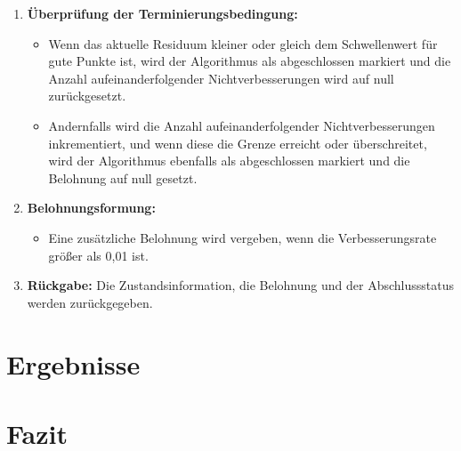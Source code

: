 \documentclass{article}
\theoremstyle{newline}
\begin{document}
\begin{onehalfspace}
\begin{enumerate}
	\item \textbf{Überprüfung der Terminierungsbedingung:}
	\begin{itemize}
		\item Wenn das aktuelle Residuum kleiner oder gleich dem Schwellenwert für gute Punkte ist, wird der Algorithmus als abgeschlossen markiert und die Anzahl aufeinanderfolgender Nichtverbesserungen wird auf null zurückgesetzt.
		\item Andernfalls wird die Anzahl aufeinanderfolgender Nichtverbesserungen inkrementiert, und wenn diese die Grenze erreicht oder überschreitet, wird der Algorithmus ebenfalls als abgeschlossen markiert und die Belohnung auf null gesetzt.
	\end{itemize}
	
	\item \textbf{Belohnungsformung:}
	\begin{itemize}
		\item Eine zusätzliche Belohnung wird vergeben, wenn die Verbesserungsrate größer als 0,01 ist.
	\end{itemize}
	
	\item \textbf{Rückgabe:}
	Die Zustandsinformation, die Belohnung und der Abschlussstatus werden zurückgegeben.
\end{enumerate}




\section{Ergebnisse}

\section{Fazit}



\end{onehalfspace}
\end{document}
